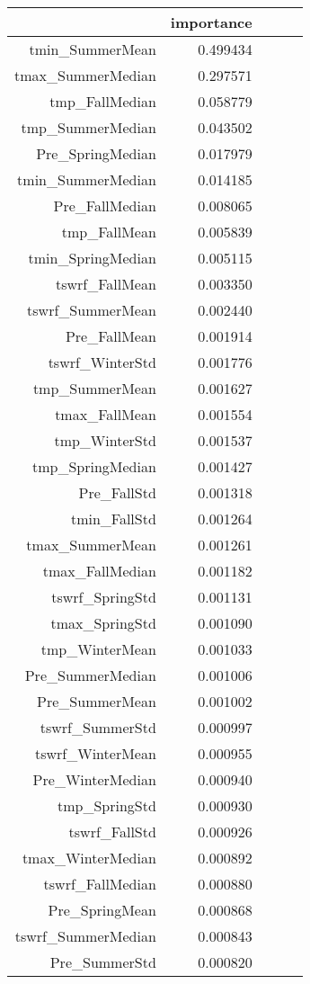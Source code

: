 \begin{tabular}{rrrrr}
\toprule
 & importance \\
\midrule
tmin_SummerMean & 0.499434 \\
tmax_SummerMedian & 0.297571 \\
tmp_FallMedian & 0.058779 \\
tmp_SummerMedian & 0.043502 \\
Pre_SpringMedian & 0.017979 \\
tmin_SummerMedian & 0.014185 \\
Pre_FallMedian & 0.008065 \\
tmp_FallMean & 0.005839 \\
tmin_SpringMedian & 0.005115 \\
tswrf_FallMean & 0.003350 \\
tswrf_SummerMean & 0.002440 \\
Pre_FallMean & 0.001914 \\
tswrf_WinterStd & 0.001776 \\
tmp_SummerMean & 0.001627 \\
tmax_FallMean & 0.001554 \\
tmp_WinterStd & 0.001537 \\
tmp_SpringMedian & 0.001427 \\
Pre_FallStd & 0.001318 \\
tmin_FallStd & 0.001264 \\
tmax_SummerMean & 0.001261 \\
tmax_FallMedian & 0.001182 \\
tswrf_SpringStd & 0.001131 \\
tmax_SpringStd & 0.001090 \\
tmp_WinterMean & 0.001033 \\
Pre_SummerMedian & 0.001006 \\
Pre_SummerMean & 0.001002 \\
tswrf_SummerStd & 0.000997 \\
tswrf_WinterMean & 0.000955 \\
Pre_WinterMedian & 0.000940 \\
tmp_SpringStd & 0.000930 \\
tswrf_FallStd & 0.000926 \\
tmax_WinterMedian & 0.000892 \\
tswrf_FallMedian & 0.000880 \\
Pre_SpringMean & 0.000868 \\
tswrf_SummerMedian & 0.000843 \\
Pre_SummerStd & 0.000820 \\

\end{tabular}
